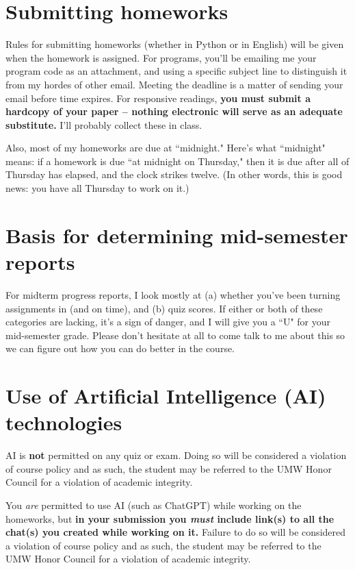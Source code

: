 \documentclass[12pt]{article}
\begin{document}
\section*{Submitting homeworks}

Rules for submitting homeworks (whether in Python or in English) will be
given when the homework is assigned. For programs, you'll be emailing me your
program code as an attachment, and using a specific subject line to
distinguish it from my hordes of other email. Meeting the deadline is a
matter of sending your email before time expires. For responsive readings,
\textbf{you must submit a hardcopy of your paper -- nothing electronic will
serve as an adequate substitute.} I'll probably collect these in class.

Also, most of my homeworks are due at ``midnight." Here's what ``midnight"
means: if a homework is due ``at midnight on Thursday," then it is due after
all of Thursday has elapsed, and the clock strikes twelve. (In other words,
this is good news: you have all Thursday to work on it.)

\section*{Basis for determining mid-semester reports}

For midterm progress reports, I look mostly at (a) whether you've been
turning assignments in (and on time), and (b) quiz scores. If either or both
of these categories are lacking, it's a sign of danger, and I will give you a
``U" for your mid-semester grade. Please don't hesitate at all to come talk
to me about this so we can figure out how you can do better in the course.


\section*{Use of Artificial Intelligence (AI) technologies}

AI is \textbf{not} permitted on any quiz or exam. Doing so will be considered a
violation of course policy and as such, the student may be referred to the UMW
Honor Council for a violation of academic integrity.

You \textit{are} permitted to use AI (such as ChatGPT) while working on the
homeworks, but \textbf{in your submission you \textit{must} include link(s) to
all the chat(s) you created while working on it.} Failure to do so will be
considered a violation of course policy and as such, the student may be
referred to the UMW Honor Council for a violation of academic integrity.
\end{document}
